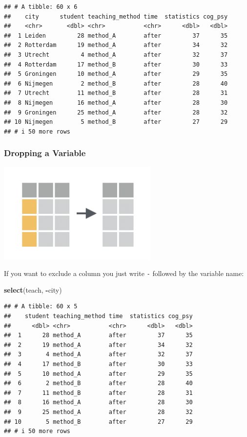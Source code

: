 \documentclass[
]{scrartcl}
\newenvironment{Shaded}{\begin{snugshade}}{\end{snugshade}}
\newcommand{\KeywordTok}[1]{\textcolor[rgb]{0.13,0.29,0.53}{\textbf{#1}}}
\newcommand{\NormalTok}[1]{#1}
\newcommand{\OperatorTok}[1]{\textcolor[rgb]{0.81,0.36,0.00}{\textbf{#1}}}
\begin{document}
\begin{verbatim}
## # A tibble: 60 x 6
##    city      student teaching_method time  statistics cog_psy
##    <chr>       <dbl> <chr>           <chr>      <dbl>   <dbl>
##  1 Leiden         28 method_A        after         37      35
##  2 Rotterdam      19 method_A        after         34      32
##  3 Utrecht         4 method_A        after         32      37
##  4 Rotterdam      17 method_B        after         30      33
##  5 Groningen      10 method_A        after         29      35
##  6 Nijmegen        2 method_B        after         28      40
##  7 Utrecht        11 method_B        after         28      31
##  8 Nijmegen       16 method_A        after         28      30
##  9 Groningen      25 method_A        after         28      32
## 10 Nijmegen        5 method_B        after         27      29
## # i 50 more rows
\end{verbatim}

\hypertarget{dropping-a-variable}{%
\subsubsection{Dropping a Variable}\label{dropping-a-variable}}

\begin{center}\includegraphics[width=300px]{images/dplyr-select-drop} \end{center}

If you want to exclude a column you just write \texttt{-} followed by the variable name:

\begin{Shaded}
\begin{Highlighting}[]
\KeywordTok{select}\NormalTok{(teach, }\OperatorTok{{-}}\NormalTok{city)}
\end{Highlighting}
\end{Shaded}

\begin{verbatim}
## # A tibble: 60 x 5
##    student teaching_method time  statistics cog_psy
##      <dbl> <chr>           <chr>      <dbl>   <dbl>
##  1      28 method_A        after         37      35
##  2      19 method_A        after         34      32
##  3       4 method_A        after         32      37
##  4      17 method_B        after         30      33
##  5      10 method_A        after         29      35
##  6       2 method_B        after         28      40
##  7      11 method_B        after         28      31
##  8      16 method_A        after         28      30
##  9      25 method_A        after         28      32
## 10       5 method_B        after         27      29
## # i 50 more rows
\end{verbatim}
\end{document}
